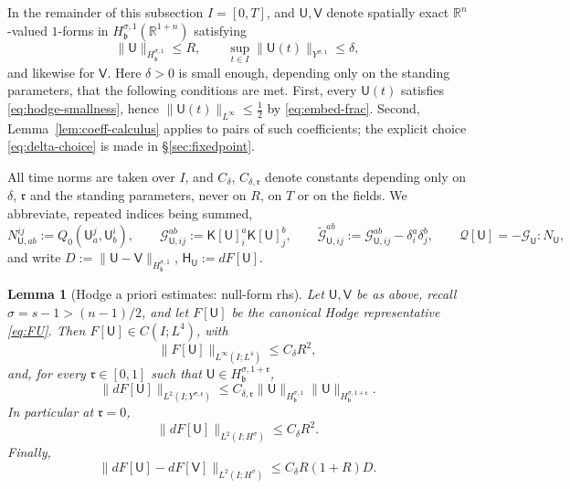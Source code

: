 \documentclass[11pt,reqno]{amsart}
\theoremstyle{plain}
\newtheorem{lemma}[theorem]{Lemma}
\theoremstyle{definition}
\theoremstyle{remark}
\numberwithin{equation}{section}
\newcommand{\breg}{\mathfrak b}
\newcommand{\rpar}{\mathfrak r}
\newcommand{\Ufield}{\mathsf U}
\newcommand{\Kmat}{\mathsf K}
\newcommand{\Ccoef}{\mathcal G}   %
\newcommand{\Hess}{\mathsf H}     %
\newcommand{\Vfield}{\mathsf V}
\newcommand{\Real}{\mathbb R}
\newcommand{\Rn}{\Real^n}
\newcommand{\Rst}{\Real^{1+n}}
\begin{document}
In the remainder of this subsection $I=[0,T]$, and $\Ufield,\Vfield$ denote
spatially exact $\Rn$-valued $1$-forms in $H^{\sigma,1}_{\breg}(\Rst)$
satisfying
\begin{equation}\label{eq:admissible}
 \|\Ufield\|_{H^{\sigma,1}_{\breg}}\le R,
 \qquad
 \sup_{t\in I}\|\Ufield(t)\|_{Y^{\sigma,1}}\le\delta ,
\end{equation}
and likewise for $\Vfield$.  Here $\delta>0$ is small enough, depending only
on the standing parameters, that the following conditions are met. First, every $\Ufield(t)$ satisfies
\eqref{eq:hodge-smallness}, hence $\|\Ufield(t)\|_{L^\infty}\le\frac12$ by
\eqref{eq:embed-frac}. Second, Lemma~\ref{lem:coeff-calculus} applies to pairs of such coefficients; the
explicit choice \eqref{eq:delta-choice} is made in \S\ref{sec:fixedpoint}.

All time norms are taken over $I$, and $C_\delta$, $C_{\delta,\rpar}$ denote
constants depending only on $\delta$, $\rpar$ and the standing parameters,
never on $R$, on $T$ or on the fields.  We abbreviate, repeated indices being
summed,
\[
 N_{\Ufield,ab}^{ij}:=Q_0(\Ufield_a^j,\Ufield_b^i),
 \qquad
 \Ccoef_{\Ufield,ij}^{ab}:=\Kmat[\Ufield]^a_i\Kmat[\Ufield]^b_j,
 \qquad
 \widetilde{\Ccoef}_{\Ufield,ij}^{ab}
 :=\Ccoef_{\Ufield,ij}^{ab}-\delta_i^a\delta_j^b,
 \qquad
 \mathcal Q[\Ufield]=-\Ccoef_{\Ufield}:N_{\Ufield},
\]
and write $D:=\|\Ufield-\Vfield\|_{H^{\sigma,1}_{\breg}}$,
$\Hess_{\Ufield}:=dF[\Ufield]$.

\begin{lemma}[Hodge a priori estimates: null-form rhs]\label{lem:pressure}
Let $\Ufield,\Vfield$ be as above, recall $\sigma=s-1>(n-1)/2$, and let
$F[\Ufield]$ be the canonical Hodge representative \eqref{eq:FU}.  Then $F[\Ufield]\in C(I;L^4)$, with
\begin{equation}\label{eq:timecontL4}
 \|F[\Ufield]\|_{L^\infty(I;L^4)}\le C_\delta R^2 ,
\end{equation}
and, for every $\rpar\in[0,1]$ such that
$\Ufield\in H^{\sigma,1+\rpar}_{\breg}$,
\begin{equation}\label{eq:pressure-anisotropic}
 \|dF[\Ufield]\|_{L^2(I;Y^{\sigma,\rpar})}
 \le C_{\delta,\rpar} 
 \|\Ufield\|_{H^{\sigma,1}_{\breg}} 
 \|\Ufield\|_{H^{\sigma,1+\rpar}_{\breg}} .
\end{equation}
In particular at $\rpar=0$,
\begin{equation}\label{eq:pressure-isotropic}
 \|dF[\Ufield]\|_{L^2(I;H^\sigma)}\le C_\delta R^2 .
\end{equation}
Finally,
\begin{equation}\label{eq:pressure-lipschitz}
 \|dF[\Ufield]-dF[\Vfield]\|_{L^2(I;H^\sigma)}
 \le C_\delta R(1+R) D .
\end{equation}
\end{lemma}
\end{document}
